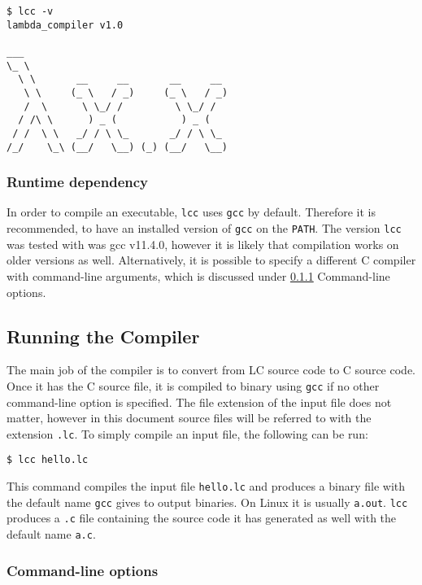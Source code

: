 \documentclass[12pt]{article}
\begin{document}
\vspace{1em}\noindent\begin{minipage}{\textwidth}
\begin{lstlisting}
$ lcc -v
lambda_compiler v1.0

___
\_ \
  \ \       __     __       __     __
   \ \     (_ \   / _)     (_ \   / _)
   /  \      \ \_/ /         \ \_/ /
  / /\ \      ) _ (           ) _ (
 / /  \ \   _/ / \ \_       _/ / \ \_
/_/    \_\ (__/   \__) (_) (__/   \__)
\end{lstlisting}
\end{minipage}

\subsubsection{Runtime dependency}

In order to compile an executable, \texttt{lcc} uses \texttt{gcc} by default.
Therefore it is recommended, to have an installed version of \texttt{gcc} on the
\texttt{PATH}. The version \texttt{lcc} was tested with was gcc v11.4.0, however
it is likely that compilation works on older versions as well. Alternatively, it
is possible to specify a different C compiler with command-line arguments, which
is discussed under \ref{command-line-options} Command-line options.

\subsection{Running the Compiler}

The main job of the compiler is to convert from LC source code to C source code.
Once it has the C source file, it is compiled to binary using \texttt{gcc} if no
other command-line option is specified. The file extension of the input file
does not matter, however in this document source files will be referred to with
the extension \texttt{.lc}. To simply compile an input file, the following can
be run:
\begin{lstlisting}
$ lcc hello.lc
\end{lstlisting}
This command compiles the input file \texttt{hello.lc} and produces a binary
file with the default name \texttt{gcc} gives to output binaries. On Linux it is
usually \texttt{a.out}. \texttt{lcc} produces a \texttt{.c} file containing the
source code it has generated as well with the default name \texttt{a.c}.

\subsubsection{Command-line options} \label{command-line-options}
\end{document}
